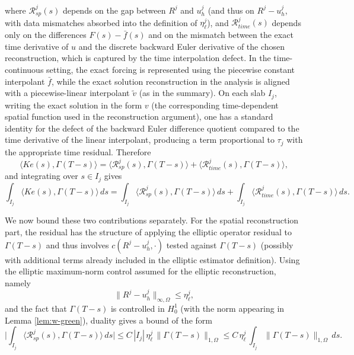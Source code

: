 \documentclass{article}
\begin{document}
where $\mathcal R_{sp}^j(s)$ depends on the gap between $R^j$ and $u_h^j$ (and thus on $R^j-u_h^j$, with data mismatches absorbed into the definition of $\eta_{\ell}^j$), and $\mathcal R_{time}^j(s)$ depends only on the differences $F(s)-\bar f(s)$ and on the mismatch between the exact time derivative of $u$ and the discrete backward Euler derivative of the chosen reconstruction, which is captured by the time interpolation defect. In the time-continuous setting, the exact forcing is represented using the piecewise constant interpolant $\bar f$, while the exact solution reconstruction in the analysis is aligned with a piecewise-linear interpolant $\tilde v$ (as in the summary). On each slab $I_j$, writing the exact solution in the form $v$ (the corresponding time-dependent spatial function used in the reconstruction argument), one has a standard identity for the defect of the backward Euler difference quotient compared to the time derivative of the linear interpolant, producing a term proportional to $\tau_j$ with the appropriate time residual. Therefore
\[
\langle K e(s), \Gamma(T-s)\rangle=\langle \mathcal R_{sp}^j(s), \Gamma(T-s)\rangle+\langle \mathcal R_{time}^j(s), \Gamma(T-s)\rangle,
\]
and integrating over $s\in I_j$ gives
\[
\int_{I_j} \langle K e(s), \Gamma(T-s)\rangle\, ds=\int_{I_j} \langle \mathcal R_{sp}^j(s), \Gamma(T-s)\rangle\, ds+\int_{I_j} \langle \mathcal R_{time}^j(s), \Gamma(T-s)\rangle\, ds.
\]

We now bound these two contributions separately. For the spatial reconstruction part, the residual has the structure of applying the elliptic operator residual to $\Gamma(T-s)$ and thus involves $c(R^j-u_h^j,\cdot)$ tested against $\Gamma(T-s)$ (possibly with additional terms already included in the elliptic estimator definition). Using the elliptic maximum-norm control assumed for the elliptic reconstruction, namely
\[
\|R^j-u_h^j\|_{\infty,\Omega}\le \eta_{\ell}^j,
\]
and the fact that $\Gamma(T-s)$ is controlled in $H^1_0$ (with the norm appearing in Lemma \ref{lem:w-green}), duality gives a bound of the form
\[
\Big|\int_{I_j} \langle \mathcal R_{sp}^j(s), \Gamma(T-s)\rangle\, ds\Big|\le C\,|I_j|\,\eta_{\ell}^j\,\|\Gamma(T-s)\|_{1,\Omega} \le C\,\eta_{\ell}^j\,\int_{I_j}\|\Gamma(T-s)\|_{1,\Omega}\, ds.
\]
\end{document}
